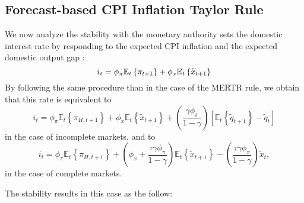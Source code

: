 \documentclass{article}
\begin{document}
\subsection{Forecast-based CPI Inflation Taylor Rule}

We now analyze the stability with the monetary authority sets the domestic
interest rate by responding to the expected CPI inflation and the expected
domestic output gap :%
\begin{equation*}
i_{t}=\phi _{\pi }\mathbb{E}_{t}\left\{ \pi _{t+1}\right\} +\phi _{x}\mathbb{%
E}_{t}\left\{ \widetilde{x}_{t+1}\right\} 
\end{equation*}%
By following the same procedure than in the case of the MERTR rule, we
obtain that this rate is equivalent to%
\begin{equation*}
i_{t}=\phi _{\pi }\mathbb{E}_{t}\left\{ \pi _{H,t+1}\right\} +\phi _{x}%
\mathbb{E}_{t}\left\{ \widetilde{x}_{t+1}\right\} +\left( \frac{\gamma \phi
_{\pi }}{1-\gamma }\right) \left[ \mathbb{E}_{t}\left\{ \widetilde{q}%
_{t+1}\right\} -\widetilde{q}_{t}\right] 
\end{equation*}%
in the case of incomplete markets, and to%
\begin{equation*}
i_{t}=\phi _{\pi }\mathbb{E}_{t}\left\{ \pi _{H,t+1}\right\} +\left( \phi
_{x}+\frac{\tau \gamma \phi _{\pi }}{1-\gamma }\right) \mathbb{E}_{t}\left\{ 
\widetilde{x}_{t+1}\right\} -\left( \frac{\tau \gamma \phi _{\pi }}{1-\gamma 
}\right) \widetilde{x}_{t},
\end{equation*}%
in the case of complete markets.

The stability results in this case as the follow:
\end{document}
